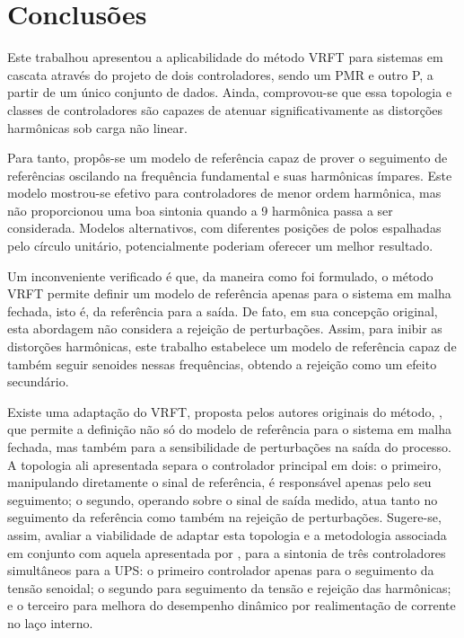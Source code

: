 \documentclass[repeatfields,oneside,overleaf]{tcc}
\begin{document}

\chapter{Conclusões}\label{sec:conclusao}

Este trabalhou apresentou a aplicabilidade do método VRFT para sistemas em cascata através do projeto de dois controladores, sendo um PMR e outro P, a partir de um único conjunto de dados.
Ainda, comprovou-se que essa topologia e classes de controladores são capazes de atenuar significativamente as distorções harmônicas sob carga não linear.

Para tanto, propôs-se um modelo de referência capaz de prover o seguimento de referências oscilando na frequência fundamental e suas harmônicas ímpares.
Este modelo mostrou-se efetivo para controladores de menor ordem harmônica, mas não proporcionou uma boa sintonia quando a 9{\textordfeminine} harmônica passa a ser considerada.
Modelos alternativos, com diferentes posições de polos espalhadas pelo círculo unitário, potencialmente poderiam oferecer um melhor resultado.

Um inconveniente verificado é que, da maneira como foi formulado, o método VRFT permite definir um modelo de referência apenas para o sistema em malha fechada, isto é, da referência para a saída.
De fato, em sua concepção original, esta abordagem não considera a rejeição de perturbações.
Assim, para inibir as distorções harmônicas, este trabalho estabelece um modelo de referência capaz de também seguir senoides nessas frequências, obtendo a rejeição como um efeito secundário.

Existe uma adaptação do VRFT, proposta pelos autores originais do método, \textcite{Lecchini2001}, que permite a definição não só do modelo de referência para o sistema em malha fechada, mas também para a sensibilidade de perturbações na saída do processo.
A topologia ali apresentada separa o controlador principal em dois:
o primeiro, manipulando diretamente o sinal de referência, é responsável apenas pelo seu seguimento;
o segundo, operando sobre o sinal de saída medido, atua tanto no seguimento da referência como também na rejeição de perturbações.
Sugere-se, assim, avaliar a viabilidade de adaptar esta topologia e a metodologia associada em conjunto com aquela apresentada por \textcite{Chrystian2020}, para a sintonia de três controladores simultâneos para a UPS:
o primeiro controlador apenas para o seguimento da tensão senoidal;
o segundo para seguimento da tensão e rejeição das harmônicas; e
o terceiro para melhora do desempenho dinâmico por realimentação de corrente no laço interno.
\end{document}
